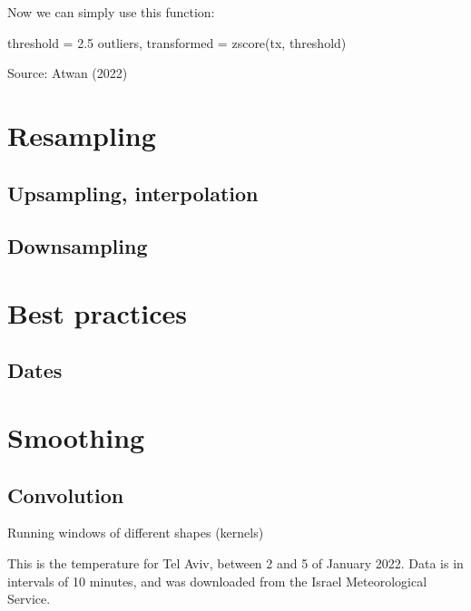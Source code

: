 \documentclass[
  letterpaper,
  DIV=11,
  numbers=noendperiod,
  oneside]{scrreprt}
\newenvironment{Shaded}{\begin{snugshade}}{\end{snugshade}}
\newcommand{\FloatTok}[1]{\textcolor[rgb]{0.68,0.00,0.00}{#1}}
\newcommand{\NormalTok}[1]{\textcolor[rgb]{0.00,0.23,0.31}{#1}}
\newcommand{\OperatorTok}[1]{\textcolor[rgb]{0.37,0.37,0.37}{#1}}
\begin{document}
Now we can simply use this function:

\begin{Shaded}
\begin{Highlighting}[]
\NormalTok{threshold }\OperatorTok{=} \FloatTok{2.5}
\NormalTok{outliers, transformed }\OperatorTok{=}\NormalTok{ zscore(tx, threshold)}
\end{Highlighting}
\end{Shaded}

Source: Atwan (2022)

\part{Resampling}

\hypertarget{upsampling-interpolation}{%
\chapter{Upsampling, interpolation}\label{upsampling-interpolation}}

\hypertarget{downsampling-1}{%
\chapter{Downsampling}\label{downsampling-1}}

\part{Best practices}

\hypertarget{dates}{%
\chapter{Dates}\label{dates}}

\part{Smoothing}

\hypertarget{convolution}{%
\chapter{Convolution}\label{convolution}}

Running windows of different shapes (kernels)

\hfill\break

This is the temperature for Tel Aviv, between 2 and 5 of January 2022.
Data is in intervals of 10 minutes, and was downloaded from the Israel
Meteorological Service.
\end{document}
